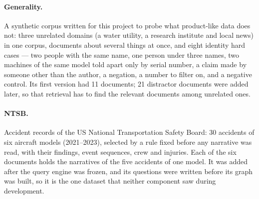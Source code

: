 \paragraph{Generality.} A synthetic corpus written for this project to probe what product-like data does
not: three unrelated domains (a water utility, a research institute and local news) in one corpus, documents
about several things at once, and eight identity hard cases --- two people with the same name, one person
under three names, two machines of the same model told apart only by serial number, a claim made by someone
other than the author, a negation, a number to filter on, and a negative control. Its first version had 11 documents; 21 distractor documents were added later, so that
retrieval has to find the relevant documents among unrelated ones.

\paragraph{NTSB.} Accident records of the US National Transportation Safety Board: 30 accidents of six
aircraft models (2021--2023), selected by a rule fixed before any narrative was read, with their findings,
event sequences, crew and injuries. Each of the six documents holds the narratives of the five accidents of
one model. It was added after the query engine was frozen, and its questions were written before its graph
was built, so it is the one dataset that neither component saw during development.

